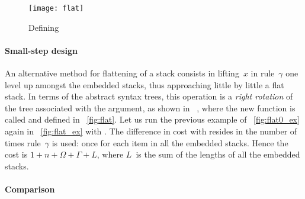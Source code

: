 %
\begin{wrapfigure}[7]{r}[0pt]{0pt}
\centering
\texttt{[image: flat]}%
\caption{Defining \label{fig:flat}
}
\end{wrapfigure}

\paragraph{Small-step design}

An alternative method for flattening of a stack consists in
lifting~\(x\) in rule~\(\gamma\) one level up amongst the embedded
stacks, thus approaching little by little a flat stack. In terms of
the abstract syntax trees, this operation is a \emph{right
  rotation} of the tree associated with
the argument, as shown in \figs~,
where the new function is called
 and defined in
\fig~\vref{fig:flat}. Let us run the previous example of
\fig~\vref{fig:flat0_ex} again in \fig~\vref{fig:flat_ex} with
. The difference in cost with
 resides in the number
of times rule~\(\gamma\) is used: once for each item in all the
embedded stacks. Hence the
cost\label{cost:flat} is \(1 + n + \Omega
+ \Gamma + L\), where \(L\)~is the sum of the lengths of all the
embedded stacks.

\paragraph{Comparison}

